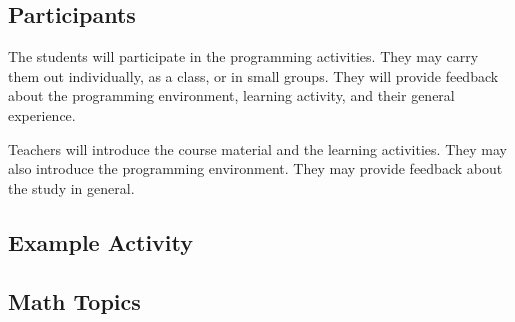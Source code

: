 \subsection*{Participants}
    The students will participate in the programming activities. They may carry them out individually, as a class, or in small groups. They will provide feedback about the programming environment, learning activity, and their general experience.

    Teachers will introduce the course material and the learning activities. They may also introduce the programming environment. They may provide feedback about the study in general.
    
\subsection*{Example Activity}

\subsection*{Math Topics}
